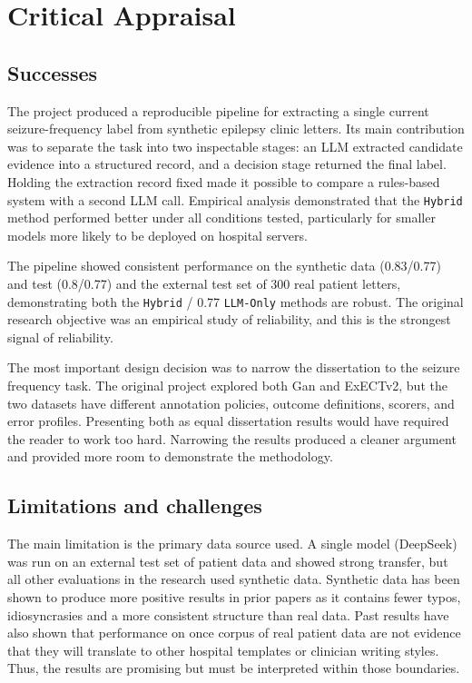 \documentclass[conference]{IEEEtran}
\begin{document}
\section{Critical Appraisal}

\subsection{Successes}

The project produced a reproducible pipeline for extracting a
single current seizure-frequency label from synthetic epilepsy clinic letters.
Its main contribution was to separate the task into two inspectable stages:
an LLM extracted candidate evidence into a structured record, and a decision
stage returned the final label. Holding the extraction record fixed made it
possible to compare a rules-based system with a second LLM call. Empirical
analysis demonstrated that the \texttt{Hybrid} method performed better under 
all conditions tested, particularly for smaller models more likely to be deployed
on hospital servers.

The pipeline showed consistent performance on the synthetic data (0.83/0.77)
and test (0.8/0.77) and the external test set of 300 real patient letters, demonstrating 
both the \texttt{Hybrid} / 0.77 \texttt{LLM-Only} methods are robust. The original
research objective was an empirical study of reliability, and this is the strongest
signal of reliability.

The most important design decision was to narrow the dissertation to the
seizure frequency task. The original project explored both Gan and ExECTv2,
but the two datasets have different annotation policies, outcome definitions,
scorers, and error profiles. Presenting both as equal dissertation results
would have required the reader to work too hard. Narrowing the results 
produced a cleaner argument and provided more room to demonstrate the
methodology. 

\subsection{Limitations and challenges}

The main limitation is the primary data source used. A single model (DeepSeek)
was run on an external test set of patient data and showed strong transfer, but all other 
evaluations in the research used synthetic data. Synthetic data has been shown
to produce more positive results in prior papers as it contains fewer typos, 
idiosyncrasies and a more consistent structure than real data. Past results have also
shown that performance on once corpus of real patient data are not evidence that
they will translate to other hospital templates or clinician writing styles. Thus, 
the results are promising but must be interpreted within those boundaries.
\end{document}
